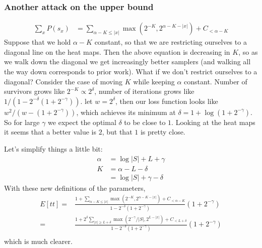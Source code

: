 \documentclass{article}
\begin{document}
\subsubsection{Another attack on the upper bound}
\begin{align}
\sum_x P(s_x) & = \sum_{\alpha - K\leq |x|}\max (2^{-K},2^{\alpha -K - |x|}) + C_{ < \alpha - K}
\end{align}
Suppose that we hold $\alpha - K$ constant, so that we are restricting ourselves to a diagonal line on the heat maps.
Then the above equation is decreasing in $K$, so as we walk down  the diagonal we get increasingly better samplers (and walking all the way down corresponds to prior work).
What if we don't restrict ourselves to a diagonal?
Consider the case of moving $K$ while keeping $\alpha$ constant.
Number of survivors grows like $2^{-K}\propto 2^\delta$,
number of iterations grows like $1/(1 - 2^{ - \delta}(1 + 2^{ - \gamma}))$.
let $w = 2^\delta$, then our loss function looks like $w^2/(w - (1 + 2^{ - \gamma}))$,
which achieves its minimum at $\delta = 1 +\log (1 + 2^{ - \gamma})$.
So for large $\gamma$ we expect the optimal $\delta$ to be close to $1$.
Looking at the heat maps it seems that a better value is $2$, but that $1$ is pretty close.


Let's simplify things a little bit:
\begin{align}
  \alpha& = \log |S| +L + \gamma\\
  K &= \alpha - L - \delta\\
  & = \log |S| + \gamma - \delta
\end{align}
With these new definitions of the parameters,
\begin{align}
  E[tt] =& \frac{1 + \sum_{\alpha - K\leq |x|}\max (2^{-K},2^{\alpha -K - |x|}) + C_{ < \alpha - K}}{1 - 2^{ - \delta}(1 + 2^{ - \gamma})}(1 + 2^{ - \gamma})\\
   =& \frac{1 + 2^\delta\sum_{|x|\geq L + \delta}\max (2^{ - \gamma}/|S|,2^{L  - |x|}) + C_{ < L + \delta}}{1 - 2^{ - \delta}(1 + 2^{ - \gamma})}(1 + 2^{ - \gamma})\\
\end{align}
which is much clearer.
\end{document}
